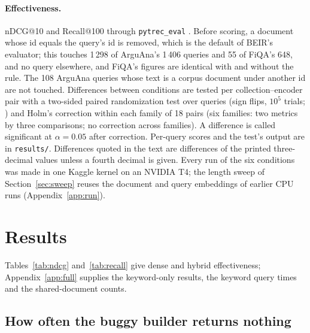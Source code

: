 \documentclass[11pt]{article}
\begin{document}
\paragraph{Effectiveness.} nDCG@10 and Recall@100 through \texttt{pytrec\_eval} \citep{vangysel2018pytrec}. Before scoring, a document whose id equals the query's id is removed, which is the default of BEIR's evaluator; this touches 1\,298 of ArguAna's 1\,406 queries and 55 of FiQA's 648, and no query elsewhere, and FiQA's figures are identical with and without the rule. The 108 ArguAna queries whose text is a corpus document under another id are not touched. Differences between conditions are tested per collection--encoder pair with a two-sided paired randomization test over queries (sign flips, $10^5$ trials; \citealp{smucker2007comparison}) and Holm's correction within each family of 18 pairs (six families: two metrics by three comparisons; no correction across families). A difference is called significant at $\alpha = 0.05$ after correction. Per-query scores and the test's output are in \texttt{results/}. Differences quoted in the text are differences of the printed three-decimal values unless a fourth decimal is given. Every run of the six conditions was made in one Kaggle kernel on an NVIDIA T4; the length sweep of Section~\ref{sec:sweep} reuses the document and query embeddings of earlier CPU runs (Appendix~\ref{app:run}).

\section{Results}
\label{sec:results}

Tables~\ref{tab:ndcg} and~\ref{tab:recall} give dense and hybrid effectiveness; Appendix~\ref{app:full} supplies the keyword-only results, the keyword query times and the shared-document counts.

\subsection{How often the buggy builder returns nothing}
\label{sec:leg}
\end{document}
